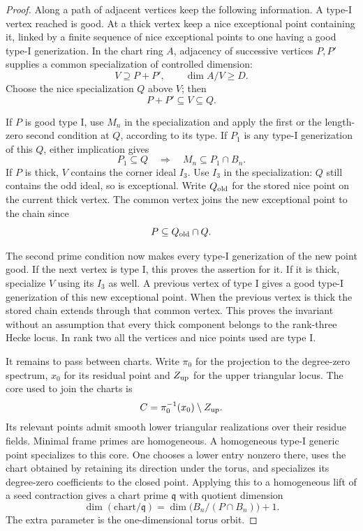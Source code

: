 \begin{proof}
Along a path of adjacent vertices keep the following information.
A type-I vertex reached is good. At a thick vertex keep a
nice exceptional point containing it, linked by a finite
sequence of nice exceptional points to one having a good type-I
generization. In the chart ring \(A\), adjacency of successive vertices \(P,P'\) supplies a common specialization of controlled dimension: 
\[
 V\supseteq P+P',\qquad\dim A/V\ge D.
\]
 Choose the nice specialization \(Q\) above \(V\); then
\[
                       P+P'\subseteq V\subseteq Q .
\]

If \(P\) is good type I, use \(M_n\) in the specialization
and apply the first or the length-zero second condition at
\(Q\), according to its type. If \(P_1\) is any type-I generization of this \(Q\), either implication gives 
\[
 P_1\subseteq Q\quad\Longrightarrow\quad M_n\subseteq P_1\cap B_n.
\]
 If \(P\) is thick, \(V\)
contains the corner ideal \(I_3\). Use \(I_3\) in the
specialization: \(Q\) still contains the odd ideal, so is
exceptional.
Write \(Q_{\rm old}\) for the stored nice point on the current thick vertex. The common vertex joins the new exceptional point to the chain since 
\[
 P\subseteq Q_{\rm old}\cap Q.
\]

The second prime condition now makes every type-I generization
of the new point good. If the next vertex is type I, this proves
the assertion for it. If it is thick, specialize \(V\) using
its \(I_3\) as well. A previous vertex of type I gives a good type-I generization of this new exceptional point. When the previous vertex is
thick the stored chain extends through that common vertex.
This proves the invariant without an assumption that every
thick component belongs to the rank-three Hecke locus.
In rank two all the vertices and nice points used are type I.

It remains to pass between charts. Write \(\pi_0\) for the projection to the degree-zero spectrum, \(x_0\) for its residual point and \(Z_{\rm up}\) for the upper triangular locus. The core used to join the charts is 
\[
 C=\pi_0^{-1}(x_0)\setminus Z_{\rm up}.
\]
 Its relevant points admit smooth lower
triangular realizations over their residue fields. Minimal
frame primes are homogeneous. A homogeneous type-I generic
point specializes to this core. One chooses a lower entry nonzero
there, uses the chart obtained by retaining its direction under
the torus, and specializes its degree-zero coefficients to the
closed point.  Applying this to a homogeneous lift of a seed contraction gives a chart prime \(\mathfrak q\) with quotient dimension
\[
 \dim(\text{chart}/\mathfrak q)=\dim\bigl(B_n/(P\cap B_n)\bigr)+1 .
\] The extra parameter is the one-dimensional torus orbit.


\end{proof}
